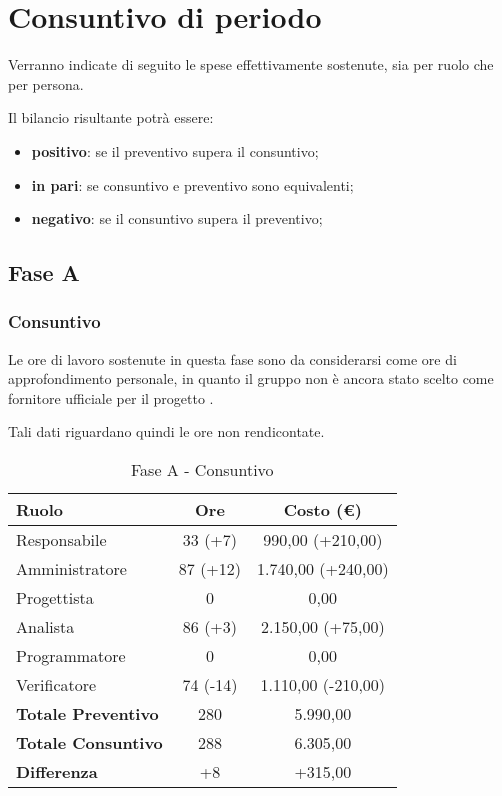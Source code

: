 \documentclass[../PianoProgetto.tex]{subfiles}
\begin{document}
\section{Consuntivo di periodo}
\label{sec:consuntivo}

	Verranno indicate di seguito le spese effettivamente sostenute, sia per ruolo che per persona.
	 
	Il bilancio risultante potrà essere: 
	\begin{itemize}
		\item \textbf{positivo}: se il preventivo supera il consuntivo;
		\item \textbf{in pari}: se consuntivo e preventivo sono equivalenti;
		\item \textbf{negativo}: se il consuntivo supera il preventivo;
	\end{itemize}

	\subsection{Fase A}
		\subsubsection{Consuntivo}
		Le ore di lavoro sostenute in questa fase sono da considerarsi come ore di approfondimento personale, in quanto il gruppo \leaf{} non è ancora stato scelto come fornitore ufficiale per il progetto \progetto.
		
		Tali dati riguardano quindi le ore non rendicontate.

		
\begin{table}[h]
		\centering
		\begin{tabular}{l * {2}{c}}
			\toprule
			\textbf{Ruolo} & \textbf{Ore} & \textbf{Costo (\euro{})} \\
			\midrule
			Responsabile &	33 (+7) & 990,00 (+210,00)\\
			Amministratore & 87 (+12) & 1.740,00 (+240,00)\\
			Progettista & 0 & 0,00 \\
			Analista & 86 (+3) & 2.150,00 (+75,00)\\
			Programmatore & 0 & 0,00 \\
			Verificatore & 74 (-14) & 1.110,00 (-210,00)\\
			\midrule
			\textbf{Totale Preventivo} & 280
 & 5.990,00
 \\		
			\textbf{Totale Consuntivo} & 288 & 6.305,00
 \\
			\midrule
			\textbf{Differenza} & +8 & +315,00 \\
			\bottomrule
		\end{tabular}
		
		\caption{Fase A - Consuntivo}
		\label{tab:consuntivoA}
		
	\end{table}		
		
\end{document}
